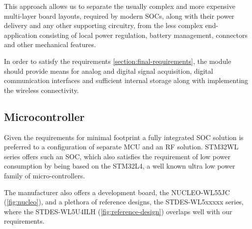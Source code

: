 This approach allows us to separate the usually complex and more expensive multi-layer board layouts, required by modern SOCs, along with their power delivery and any other supporting circuitry, from the less complex end-application consisting of local power regulation, battery management, connectors and other mechanical features.

In order to satisfy the requirements \ref{section:final-requirements}, the module should provide means for analog and digital signal acquisition, digital communication interfaces and sufficient internal storage along with implementing the wireless connectivity.

\subsection{\label{section:mcu}Microcontroller}
Given the requirements for minimal footprint a fully integrated SOC solution is preferred to a configuration of separate MCU and an RF solution. STM32WL series offers such an SOC, which also satisfies the requirement of low power consumption by being based on the STM32L4, a well known ultra low power family of micro-controllers.

The manufacturer also offers a development board, the NUCLEO-WL55JC (\ref{fig:nucleo}), and a plethora of reference designs, the STDES-WL5xxxxx series, where the STDES-WL5U4ILH (\ref{fig:reference-design}) overlaps well with our requirements.

